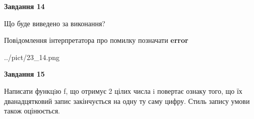 \documentclass[11pt, ukrainian]{article}
\begin{document}
{\begin {large}
{\begin {center}\textbf{Завдання 14}\end {center}}\par
Що буде виведено за виконання? \par
Повідомлення інтерпретатора про помилку позначати \textbf{error}

\begin{center}
	{../pict/23_14.png}
\end{center}
\newpage

{\begin {center}\textbf{Завдання 15}\end {center}}\par

Написати функцiю f, що отримує 2 цілих числа i повертає ознаку того, що їх дванадцятковий запис закінчується на одну ту саму цифру. Стиль запису умови також оцінюється.\par
\newpage

\end {large}}
\end{document}
